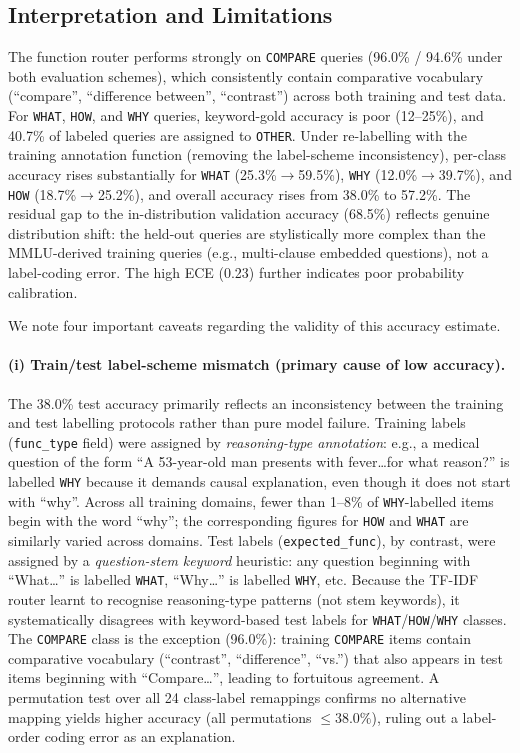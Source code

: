 \documentclass[a4paper,fleql,doubleblind]{cas-sc}
\begin{document}
\subsection*{Interpretation and Limitations}

The function router performs strongly on \texttt{COMPARE} queries (96.0\% /
94.6\% under both evaluation schemes), which consistently contain comparative
vocabulary (``compare'', ``difference between'', ``contrast'') across both
training and test data.
For \texttt{WHAT}, \texttt{HOW}, and \texttt{WHY} queries, keyword-gold
accuracy is poor (12--25\%), and 40.7\% of labeled queries are assigned to
\texttt{OTHER}.
Under re-labelling with the training annotation function (removing the
label-scheme inconsistency), per-class accuracy rises substantially for
\texttt{WHAT} (25.3\%$\to$59.5\%), \texttt{WHY} (12.0\%$\to$39.7\%), and
\texttt{HOW} (18.7\%$\to$25.2\%), and overall accuracy rises from 38.0\% to
57.2\%.
The residual gap to the in-distribution validation accuracy (68.5\%) reflects
genuine distribution shift: the held-out queries are stylistically more complex
than the MMLU-derived training queries (e.g., multi-clause embedded questions),
not a label-coding error.
The high ECE (0.23) further indicates poor probability calibration.

We note four important caveats regarding the validity of this accuracy estimate.

\paragraph{(i) Train/test label-scheme mismatch (primary cause of low accuracy).}
The 38.0\% test accuracy primarily reflects an inconsistency between the
training and test labelling protocols rather than pure model failure.
Training labels (\texttt{func\_type} field) were assigned by
\emph{reasoning-type annotation}: e.g., a medical question of the form
``A 53-year-old man presents with fever\ldots for what reason?'' is
labelled \texttt{WHY} because it demands causal explanation, even though it
does not start with ``why''. Across all training domains, fewer than 1--8\%
of \texttt{WHY}-labelled items begin with the word ``why''; the corresponding
figures for \texttt{HOW} and \texttt{WHAT} are similarly varied across domains.
Test labels (\texttt{expected\_func}), by contrast, were assigned by a
\emph{question-stem keyword} heuristic: any question beginning with
``What\ldots'' is labelled \texttt{WHAT}, ``Why\ldots'' is labelled
\texttt{WHY}, etc.
Because the TF-IDF router learnt to recognise reasoning-type patterns (not
stem keywords), it systematically disagrees with keyword-based test labels
for \texttt{WHAT}/\texttt{HOW}/\texttt{WHY} classes.
The \texttt{COMPARE} class is the exception (96.0\%): training
\texttt{COMPARE} items contain comparative vocabulary (``contrast'',
``difference'', ``vs.'') that also appears in test items beginning with
``Compare\ldots'', leading to fortuitous agreement.
A permutation test over all 24 class-label remappings confirms no alternative
mapping yields higher accuracy (all permutations $\leq 38.0\%$), ruling out a
label-order coding error as an explanation.
\end{document}
